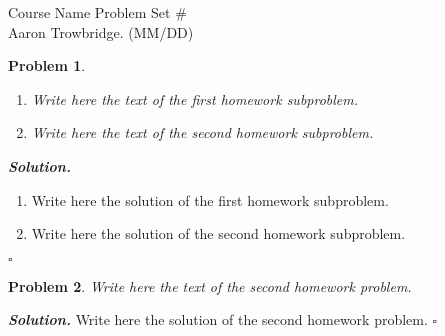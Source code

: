 \documentclass[12pt]{article}
\newtheorem{problem}{Problem}
\newenvironment{solution}[1][\it{Solution}]{\noindent\textbf{#1. } }{\hfill$\square$}
\begin{document}
\noindent Course Name \hfill Problem Set \#\\
Aaron Trowbridge. (MM/DD)

\hrulefill


\begin{problem}
  \hfill
  \begin{enumerate}
    \item[(a)] Write here the text of the first homework subproblem.
    \item[(b)] Write here the text of the second homework subproblem.
  \end{enumerate}
\end{problem}
\begin{solution}
  \begin{enumerate}
    \item[(a)] Write here the solution of the first homework subproblem.
    \item[(b)] Write here the solution of the second homework subproblem.
  \end{enumerate}
\end{solution} 

\begin{problem}
Write here the text of the second homework problem.
\end{problem}
\begin{solution}
	Write here the solution of the second homework problem.
\end{solution}

 
\end{document}
